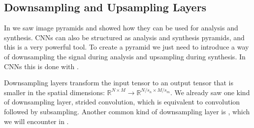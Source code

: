 \subsection{Downsampling and Upsampling Layers}


In \chap{\ref{chapter:image_pyramids}} we saw image pyramids and showed how they can be used for analysis and synthesis. CNNs can also be structured as analysis and synthesis pyramids, and this is a very powerful tool. To create a pyramid we just need to introduce a way of downsampling the signal during analysis and upsampling during synthesis. In CNNs this is done with .


Downsampling layers transform the input tensor to an output tensor that is smaller in the spatial dimensions: $\mathbb{R}^{N \times M} \rightarrow \mathbb{R}^{N/s_n \times M/s_m}$. We already saw one kind of downsampling layer, strided convolution, which is equivalent to convolution followed by subsampling. Another common kind of downsampling layer is , which we will encounter in \sect{\ref{sec:convolutional_neural_nets:pooling_layers}}.

